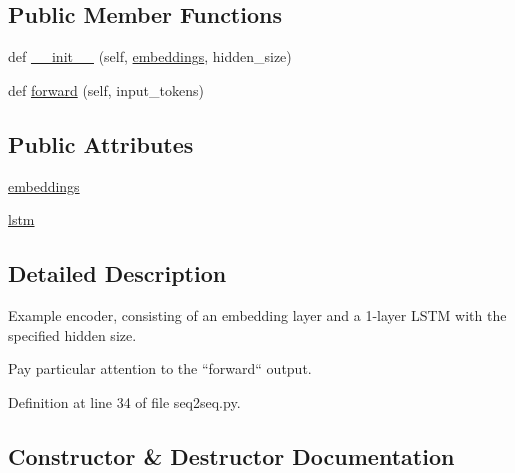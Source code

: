 \subsection*{Public Member Functions}
\begin{DoxyCompactItemize}
\item 
def \hyperlink{classparlai_1_1agents_1_1examples_1_1seq2seq_1_1Encoder_aca919c541c6b99e881546856d6d3e614}{\+\_\+\+\_\+init\+\_\+\+\_\+} (self, \hyperlink{classparlai_1_1agents_1_1examples_1_1seq2seq_1_1Encoder_a424e06ccc9c3aab6726981f738e3b833}{embeddings}, hidden\+\_\+size)
\item 
def \hyperlink{classparlai_1_1agents_1_1examples_1_1seq2seq_1_1Encoder_a5d231c02801af8c5155c997111bc803a}{forward} (self, input\+\_\+tokens)
\end{DoxyCompactItemize}
\subsection*{Public Attributes}
\begin{DoxyCompactItemize}
\item 
\hyperlink{classparlai_1_1agents_1_1examples_1_1seq2seq_1_1Encoder_a424e06ccc9c3aab6726981f738e3b833}{embeddings}
\item 
\hyperlink{classparlai_1_1agents_1_1examples_1_1seq2seq_1_1Encoder_a8dc64f513d6f124aa80ba82f18cb12f1}{lstm}
\end{DoxyCompactItemize}


\subsection{Detailed Description}
\begin{DoxyVerb}Example encoder, consisting of an embedding layer and a 1-layer LSTM with the
specified hidden size.

Pay particular attention to the ``forward`` output.
\end{DoxyVerb}
 

Definition at line 34 of file seq2seq.\+py.



\subsection{Constructor \& Destructor Documentation}
\mbox{\label{classparlai_1_1agents_1_1examples_1_1seq2seq_1_1Encoder_aca919c541c6b99e881546856d6d3e614}} 
